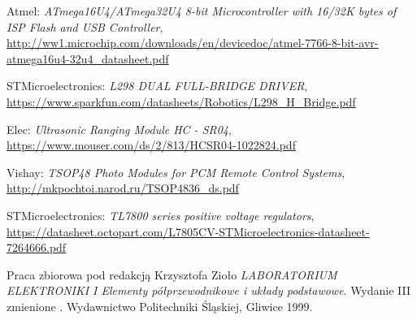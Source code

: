 \documentclass[11pt]{article}
\begin{document}
\begin{thebibliography}{9}
Atmel: \textit{ATmega16U4/ATmega32U4 8-bit Microcontroller with 16/32K bytes of ISP Flash and USB Controller}, \url{http://ww1.microchip.com/downloads/en/devicedoc/atmel-7766-8-bit-avr-atmega16u4-32u4\_datasheet.pdf}

STMicroelectronics: \textit{L298
DUAL FULL-BRIDGE DRIVER}, \url{https://www.sparkfun.com/datasheets/Robotics/L298_H_Bridge.pdf}

Elec: \textit{Ultrasonic Ranging Module HC - SR04}, \url{https://www.mouser.com/ds/2/813/HCSR04-1022824.pdf}

Vishay: \textit{TSOP48 Photo Modules for PCM Remote Control Systems}, \url{http://mkpochtoi.narod.ru/TSOP4836_ds.pdf}

STMicroelectronics: \textit{TL7800 series positive voltage regulators}, \url{https://datasheet.octopart.com/L7805CV-STMicroelectronics-datasheet-7264666.pdf}

Praca zbiorowa pod redakcją Krzysztofa Zioło
\textit{LABORATORIUM ELEKTRONIKI I Elementy półprzewodnikowe i układy podstawowe}.
Wydanie III zmienione .
Wydawnictwo Politechniki Śląskiej, Gliwice 1999.

\end{thebibliography}
\end{document}
